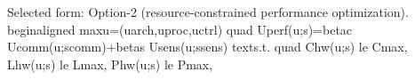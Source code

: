 \markdownRendererOlEnd \markdownRendererInterblockSeparator
{}
\markdownRendererSectionEnd \markdownRendererSectionBegin
{}\markdownRendererInterblockSeparator
{}Selected form: Option-2 (resource-constrained performance optimization).\markdownRendererParagraphSeparator
{}\markdownRendererDollarSign{}\markdownRendererDollarSign{}\markdownRendererSoftLineBreak
{}\markdownRendererBackslash{}begin\markdownRendererLeftBrace{}aligned\markdownRendererRightBrace{}\markdownRendererSoftLineBreak
{}\markdownRendererBackslash{}max\markdownRendererUnderscore{}\markdownRendererLeftBrace{}u=(u\markdownRendererUnderscore{}\markdownRendererLeftBrace{}arch\markdownRendererRightBrace{},u\markdownRendererUnderscore{}\markdownRendererLeftBrace{}proc\markdownRendererRightBrace{},u\markdownRendererUnderscore{}\markdownRendererLeftBrace{}ctrl\markdownRendererRightBrace{})\markdownRendererRightBrace{} \markdownRendererBackslash{}quad \markdownRendererAmpersand{} U\markdownRendererUnderscore{}\markdownRendererLeftBrace{}perf\markdownRendererRightBrace{}(u;s)=\markdownRendererBackslash{}beta\markdownRendererUnderscore{}c U\markdownRendererUnderscore{}\markdownRendererLeftBrace{}comm\markdownRendererRightBrace{}(u;s\markdownRendererUnderscore{}\markdownRendererLeftBrace{}comm\markdownRendererRightBrace{})+\markdownRendererBackslash{}beta\markdownRendererUnderscore{}s U\markdownRendererUnderscore{}\markdownRendererLeftBrace{}sens\markdownRendererRightBrace{}(u;s\markdownRendererUnderscore{}\markdownRendererLeftBrace{}sens\markdownRendererRightBrace{}) \markdownRendererBackslash{}\markdownRendererSoftLineBreak
{}\markdownRendererBackslash{}text\markdownRendererLeftBrace{}s.t.\markdownRendererRightBrace{} \markdownRendererBackslash{}quad \markdownRendererAmpersand{} C\markdownRendererUnderscore{}\markdownRendererLeftBrace{}hw\markdownRendererRightBrace{}(u;s) \markdownRendererBackslash{}le C\markdownRendererUnderscore{}\markdownRendererLeftBrace{}max\markdownRendererRightBrace{}, \markdownRendererBackslash{}\markdownRendererSoftLineBreak
{}\markdownRendererAmpersand{} L\markdownRendererUnderscore{}\markdownRendererLeftBrace{}hw\markdownRendererRightBrace{}(u;s) \markdownRendererBackslash{}le L\markdownRendererUnderscore{}\markdownRendererLeftBrace{}max\markdownRendererRightBrace{}, \markdownRendererBackslash{}\markdownRendererSoftLineBreak
{}\markdownRendererAmpersand{} P\markdownRendererUnderscore{}\markdownRendererLeftBrace{}hw\markdownRendererRightBrace{}(u;s) \markdownRendererBackslash{}le P\markdownRendererUnderscore{}\markdownRendererLeftBrace{}max\markdownRendererRightBrace{}, \markdownRendererBackslash{}\markdownRendererSoftLineBreak
